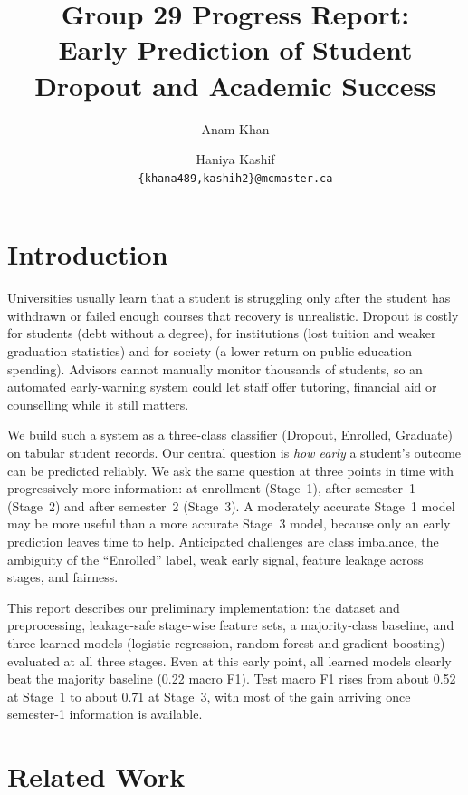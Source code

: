 \documentclass[11pt]{article}
\title{Group 29 Progress Report:\\
Early Prediction of Student Dropout and Academic Success}
\author{Anam Khan \and Haniya Kashif \\
  \texttt{\{khana489,kashih2\}@mcmaster.ca}}
\begin{document}
\maketitle

\section{Introduction}
Universities usually learn that a student is struggling only after the student has withdrawn or failed enough courses that recovery is unrealistic. Dropout is costly for students (debt without a degree), for institutions (lost tuition and weaker graduation statistics) and for society (a lower return on public education spending). Advisors cannot manually monitor thousands of students, so an automated early-warning system could let staff offer tutoring, financial aid or counselling while it still matters.
 
We build such a system as a three-class classifier (Dropout, Enrolled, Graduate) on tabular student records. Our central question is \emph{how early} a student's outcome can be predicted reliably. We ask the same question at three points in time with progressively more information: at enrollment (Stage~1), after semester~1 (Stage~2) and after semester~2 (Stage~3). A moderately accurate Stage~1 model may be more useful than a more accurate Stage~3 model, because only an early prediction leaves time to help. Anticipated challenges are class imbalance, the ambiguity of the ``Enrolled'' label, weak early signal, feature leakage across stages, and fairness.
 
This report describes our preliminary implementation: the dataset and preprocessing, leakage-safe stage-wise feature sets, a majority-class baseline, and three learned models (logistic regression, random forest and gradient boosting) evaluated at all three stages. Even at this early point, all learned models clearly beat the majority baseline (0.22 macro F1). Test macro F1 rises from about 0.52 at Stage~1 to about 0.71 at Stage~3, with most of the gain arriving once semester-1 information is available.
\section{Related Work}
\end{document}
